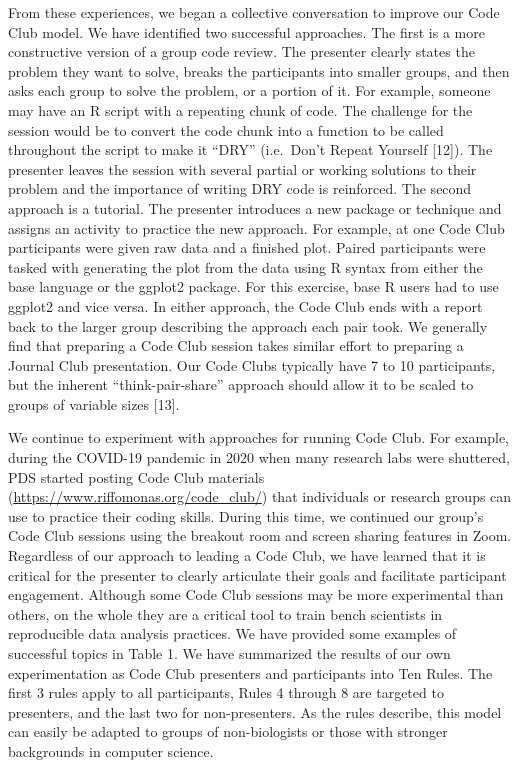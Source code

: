 \documentclass[
  11pt,
]{article}
\begin{document}
From these experiences, we began a collective conversation to improve
our Code Club model. We have identified two successful approaches. The
first is a more constructive version of a group code review. The
presenter clearly states the problem they want to solve, breaks the
participants into smaller groups, and then asks each group to solve the
problem, or a portion of it. For example, someone may have an R script
with a repeating chunk of code. The challenge for the session would be
to convert the code chunk into a function to be called throughout the
script to make it ``DRY'' (i.e.~Don't Repeat Yourself {[}12{]}). The
presenter leaves the session with several partial or working solutions
to their problem and the importance of writing DRY code is reinforced.
The second approach is a tutorial. The presenter introduces a new
package or technique and assigns an activity to practice the new
approach. For example, at one Code Club participants were given raw data
and a finished plot. Paired participants were tasked with generating the
plot from the data using R syntax from either the base language or the
ggplot2 package. For this exercise, base R users had to use ggplot2 and
vice versa. In either approach, the Code Club ends with a report back to
the larger group describing the approach each pair took. We generally
find that preparing a Code Club session takes similar effort to
preparing a Journal Club presentation. Our Code Clubs typically have 7
to 10 participants, but the inherent ``think-pair-share'' approach
should allow it to be scaled to groups of variable sizes {[}13{]}.

We continue to experiment with approaches for running Code Club. For
example, during the COVID-19 pandemic in 2020 when many research labs
were shuttered, PDS started posting Code Club materials
(\url{https://www.riffomonas.org/code_club/}) that individuals or
research groups can use to practice their coding skills. During this
time, we continued our group's Code Club sessions using the breakout
room and screen sharing features in Zoom. Regardless of our approach to
leading a Code Club, we have learned that it is critical for the
presenter to clearly articulate their goals and facilitate participant
engagement. Although some Code Club sessions may be more experimental
than others, on the whole they are a critical tool to train bench
scientists in reproducible data analysis practices. We have provided
some examples of successful topics in Table 1. We have summarized the
results of our own experimentation as Code Club presenters and
participants into Ten Rules. The first 3 rules apply to all
participants, Rules 4 through 8 are targeted to presenters, and the last
two for non-presenters. As the rules describe, this model can easily be
adapted to groups of non-biologists or those with stronger backgrounds
in computer science.
\end{document}
